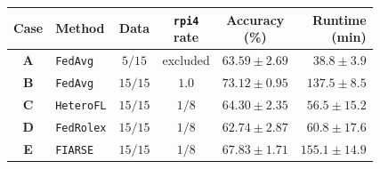\documentclass[border=2pt]{standalone}
\newcommand{\evalbest}[1]{\textcolor{evalBestText}{{\bfseries #1}}}
\newcommand{\evalsecond}[1]{\textcolor{evalSecondText}{#1}}
\begin{document}
\begingroup
\scriptsize
\setlength{\tabcolsep}{2.6pt}
\renewcommand{\arraystretch}{1.18}
\begin{tabular}{clcccr}
\toprule
Case & Method & Data & \makecell{\texttt{rpi4}\\rate} & \makecell{Accuracy\\(\%)} & \makecell{Runtime\\(min)} \\
\midrule
\textcolor{slowcaseA}{\textbf{A}} & \texttt{FedAvg}   & \(5/15\)  & excluded & \(63.59 \pm 2.69\) & \(38.8 \pm 3.9\) \\
\textcolor{slowcaseB}{\textbf{B}} & \texttt{FedAvg}   & \(15/15\) & \(1.0\)  & \(73.12 \pm 0.95\) & \(137.5 \pm 8.5\) \\
\textcolor{slowcaseC}{\textbf{C}} & \texttt{HeteroFL} & \(15/15\) & \(1/8\)  & \evalsecond{\(64.30 \pm 2.35\)} & \evalbest{\(56.5 \pm 15.2\)} \\
\textcolor{slowcaseD}{\textbf{D}} & \texttt{FedRolex} & \(15/15\) & \(1/8\)  & \(62.74 \pm 2.87\) & \evalsecond{\(60.8 \pm 17.6\)} \\
\textcolor{slowcaseE}{\textbf{E}} & \texttt{FIARSE}   & \(15/15\) & \(1/8\)  & \evalbest{\(67.83 \pm 1.71\)} & \(155.1 \pm 14.9\) \\
\bottomrule
\end{tabular}
\endgroup
\end{document}
